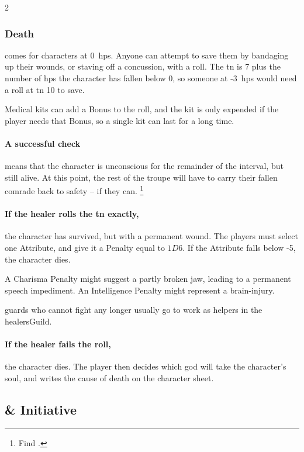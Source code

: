 \begin{multicols}{2}
\subsubsection{Death}
\label{death}
comes for characters at 0~\glspl{hp}.
Anyone can attempt to save them by bandaging up their wounds, or staving off a concussion, with a  roll.
The \gls{tn} is 7 plus the number of \glspl{hp} the character has fallen below 0, so someone at -3~\glspl{hp} would need a roll at \gls{tn} 10 to save.

Medical kits can add a Bonus to the roll, and the kit is only expended if the player needs that Bonus, so a single kit can last for a long time.

\paragraph{A successful check}
means that the character is unconscious for the remainder of the \gls{interval}, but still alive.
At this point, the rest of the troupe will have to carry their fallen comrade back to safety -- if they can.%
\footnote{Find  .}

\paragraph{If the healer rolls the \gls{tn} exactly,}
the character has survived, but with a permanent wound.
The players must select one Attribute, and give it a Penalty equal to $1D6$.
If the Attribute falls below -5, the character dies.

A Charisma Penalty might suggest a partly broken jaw, leading to a permanent speech impediment.
An Intelligence Penalty might represent a brain-injury.

\Glspl{guard} who cannot fight any longer usually go to work as \glspl{helper} in the \gls{healersGuild}.

\paragraph{If the healer fails the roll,}
the character dies.
The player then decides which god will take the character's soul, and writes the cause of death on the character sheet.

\subsection{ \& Initiative}
\label{actionPoints}


\end{multicols}
